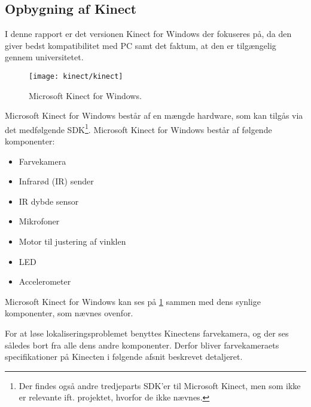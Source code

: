 \subsection{Opbygning af Kinect}\label{kinect:komponenter}
I denne rapport er det versionen Kinect for Windows der fokuseres på, da den giver bedst kompatibilitet med PC samt det faktum, at den er tilgængelig gennem universitetet.

%

\begin{figure}
\centering
\texttt{[image: kinect/kinect]}
\caption{Microsoft Kinect for Windows.}
\label{kinect:opbygning}
\end{figure}

Microsoft Kinect for Windows består af en mængde hardware, som kan tilgås via det medfølgende SDK\footnote{Der findes også andre tredjeparts SDK'er til Microsoft Kinect, men som ikke er relevante ift. projektet, hvorfor de ikke nævnes.}.
Microsoft Kinect for Windows består af følgende komponenter:

\begin{itemize}
\item Farvekamera
\item Infrarød (IR) sender
\item IR dybde sensor
\item Mikrofoner
\item Motor til justering af vinklen
\item LED
\item Accelerometer
\end{itemize}

Microsoft Kinect for Windows kan ses på \cref{kinect:opbygning} sammen med dens synlige komponenter, som nævnes ovenfor.

For at løse lokaliseringsproblemet benyttes Kinectens farvekamera, og der ses således bort fra alle dens andre komponenter.
Derfor bliver farvekameraets specifikationer på Kinecten i følgende afsnit beskrevet detaljeret.

